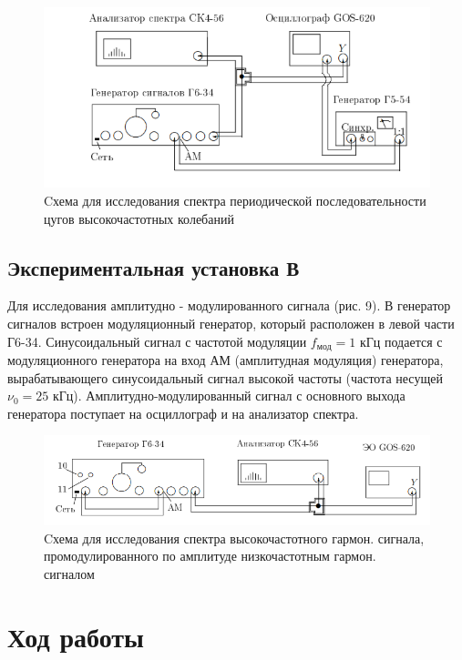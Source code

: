 \documentclass[a4paper, 14pt]{extarticle}%
\begin{document}
	
		
		\begin{figure}[h]
			\centering
			\includegraphics[width=0.8\linewidth]{pictures/sp8.png}
			\caption{Cхема для исследования спектра периодической последовательности цугов высокочастотных колебаний}
			\label{B}
		\end{figure}
		
\newpage
\newline
		
\subsection{Экспериментальная установка В}
		Для исследования амплитудно - модулированного сигнала (рис. 9). В генератор сигналов встроен модуляционный генератор, который расположен в левой части Г6-34. Синусоидальный сигнал с частотой модуляции $f_{мод}=1$ кГц подается с модуляционного генератора на вход АМ (амплитудная модуляция) генератора, вырабатывающего синусоидальный сигнал высокой частоты (частота несущей $\nu_{0}=25$ кГц). Амплитудно-модулированный сигнал с основного выхода генератора поступает на осциллограф и на анализатор спектра. 
		
		\begin{figure}[h]
			\centering
			\includegraphics[width=0.8\linewidth]{pictures/sp9.png}
			\caption{Cхема для исследования спектра высокочастотного гармон. сигнала, промодулированного по амплитуде низкочастотным гармон. сигналом}
			\label{C}
		\end{figure}
		
		
		\newpage
\newline

	\section{Ход работы}
  	
\end{document}
